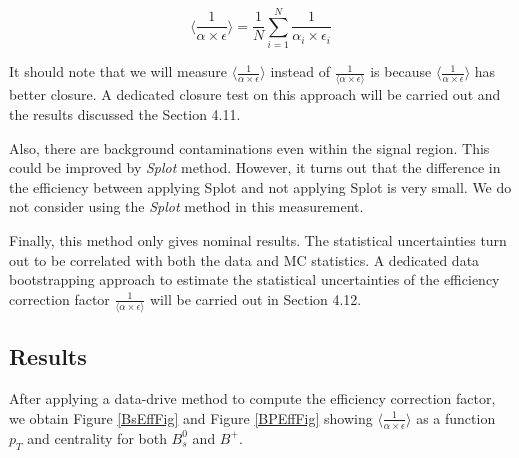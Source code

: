 \begin{equation}
\langle\frac{1}{\alpha \times \epsilon} \rangle = \frac{1}{N} \sum_{i = 1}^{N} \frac{1}{\alpha_i \times \epsilon_i}
\end{equation}

It should note that we will measure  $\langle\frac{1}{\alpha \times \epsilon} \rangle$ instead of $\frac{1}{\langle\alpha \times \epsilon \rangle}$ is because $\langle\frac{1}{\alpha \times \epsilon} \rangle$ has better closure. A dedicated closure test on this approach will be carried out and the results discussed the Section 4.11. 

Also, there are background contaminations even within the signal region. This could be improved by \textit{Splot} method. However, it turns out that the difference in the efficiency between applying Splot and not applying Splot is very small. We do not consider using the \textit{Splot} method in this measurement. 

Finally, this method only gives nominal results. The statistical uncertainties turn out to be correlated with both the data and MC statistics. A dedicated data bootstrapping approach to estimate the statistical uncertainties of the efficiency correction factor $\frac{1}{\langle\alpha \times \epsilon \rangle}$ will be carried out in Section 4.12.

\subsection{Results}

After applying a data-drive method to compute the efficiency correction factor, we obtain Figure \ref{BsEffFig} and Figure \ref{BPEffFig} showing $\langle\frac{1}{\alpha \times \epsilon} \rangle$ as a function $p_T$ and centrality for both $B_s^0$ and $B^+$.


